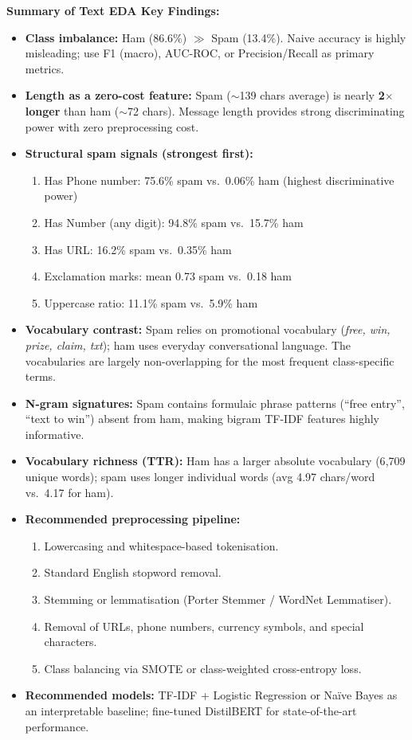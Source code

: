 \begin{importantbox}
\textbf{Summary of Text EDA Key Findings:}
\begin{itemize}
    \item \textbf{Class imbalance:} Ham (86.6\%) $\gg$ Spam (13.4\%). Naive accuracy is highly misleading; use F1 (macro), AUC-ROC, or Precision/Recall as primary metrics.
    \item \textbf{Length as a zero-cost feature:} Spam ($\sim$139 chars average) is nearly \textbf{2$\times$ longer} than ham ($\sim$72 chars). Message length provides strong discriminating power with zero preprocessing cost.
    \item \textbf{Structural spam signals (strongest first):}
    \begin{enumerate}
        \item Has Phone number: 75.6\% spam vs.\ 0.06\% ham (highest discriminative power)
        \item Has Number (any digit): 94.8\% spam vs.\ 15.7\% ham
        \item Has URL: 16.2\% spam vs.\ 0.35\% ham
        \item Exclamation marks: mean 0.73 spam vs.\ 0.18 ham
        \item Uppercase ratio: 11.1\% spam vs.\ 5.9\% ham
    \end{enumerate}
    \item \textbf{Vocabulary contrast:} Spam relies on promotional vocabulary (\textit{free, win, prize, claim, txt}); ham uses everyday conversational language. The vocabularies are largely non-overlapping for the most frequent class-specific terms.
    \item \textbf{N-gram signatures:} Spam contains formulaic phrase patterns (``free entry'', ``text to win'') absent from ham, making bigram TF-IDF features highly informative.
    \item \textbf{Vocabulary richness (TTR):} Ham has a larger absolute vocabulary (6{,}709 unique words); spam uses longer individual words (avg 4.97 chars/word vs.\ 4.17 for ham).
    \item \textbf{Recommended preprocessing pipeline:}
    \begin{enumerate}
        \item Lowercasing and whitespace-based tokenisation.
        \item Standard English stopword removal.
        \item Stemming or lemmatisation (Porter Stemmer / WordNet Lemmatiser).
        \item Removal of URLs, phone numbers, currency symbols, and special characters.
        \item Class balancing via SMOTE or class-weighted cross-entropy loss.
    \end{enumerate}
    \item \textbf{Recommended models:} TF-IDF + Logistic Regression or Na\"{i}ve Bayes as an interpretable baseline; fine-tuned DistilBERT for state-of-the-art performance.
\end{itemize}
\end{importantbox}
